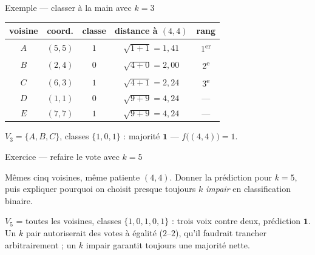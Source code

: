 \documentclass[aspectratio=169,11pt]{beamer}
\begin{document}
\begin{frame}{Exemple — classer à la main avec $k=3$}
\begin{ucadex}
{\small \begin{center}\begin{tabular}{c|cc|c|c}
voisine & coord. & classe & distance à $(4,4)$ & rang\\\hline
$A$ & $(5,5)$ & $1$ & $\sqrt{1+1} = 1{,}41$ & 1\textsuperscript{er}\\
$B$ & $(2,4)$ & $0$ & $\sqrt{4+0} = 2{,}00$ & 2\textsuperscript{e}\\
$C$ & $(6,3)$ & $1$ & $\sqrt{4+1} = 2{,}24$ & 3\textsuperscript{e}\\
$D$ & $(1,1)$ & $0$ & $\sqrt{9+9} = 4{,}24$ & —\\
$E$ & $(7,7)$ & $1$ & $\sqrt{9+9} = 4{,}24$ & —\\
\end{tabular}\end{center}
$V_3 = \{A, B, C\}$, classes $\{1, 0, 1\}$ : majorité $\mathbf{1}$ — $f\big((4,4)\big) = 1$.}
\end{ucadex}
\end{frame}

\begin{frame}{Exercice — refaire le vote avec $k=5$}
\begin{ucadrec}[Énoncé]
{\small Mêmes cinq voisines, même patiente $(4,4)$. Donner la prédiction pour $k = 5$, puis expliquer pourquoi on choisit presque toujours $k$ \emph{impair} en classification binaire.}
\end{ucadrec}
\pause
\begin{ucadex}[Correction]
{\small $V_5$ = toutes les voisines, classes $\{1, 0, 1, 0, 1\}$ : trois voix contre deux, prédiction $\mathbf{1}$. Un $k$ pair autoriserait des votes à égalité ($2$–$2$), qu'il faudrait trancher arbitrairement ; un $k$ impair garantit toujours une majorité nette.}
\end{ucadex}
\end{frame}
\end{document}
